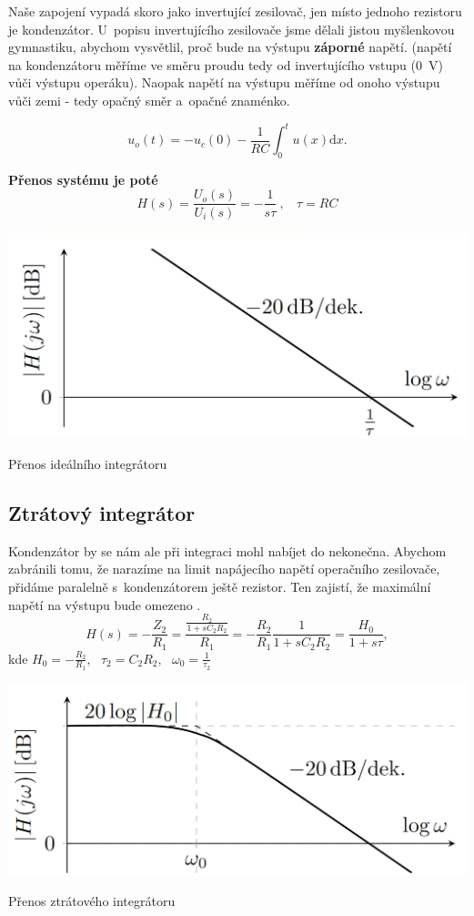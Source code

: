\documentclass[a4paper,12pt]{article}   %
\begin{document}
Naše zapojení vypadá skoro jako invertující zesilovač, jen místo jednoho rezistoru je kondenzátor. U~popisu invertujícího zesilovače jsme dělali jistou myšlenkovou gymnastiku, abychom vysvětlil, proč bude na výstupu \textbf{záporné} napětí. (napětí na kondenzátoru měříme ve směru proudu tedy od invertujícího vstupu (0~V) vůči výstupu operáku). Naopak napětí na výstupu měříme od onoho výstupu vůči zemi - tedy opačný směr a~opačné znaménko.

\begin{equation*}
    u_o(t) = - u_c(0) - \frac{1}{RC}\int_0^t u(x)\text{d}x.
\end{equation*}

\textbf{Přenos systému je poté}
\begin{equation}
    H(s) = \frac{U_o(s)}{U_i(s)} = -\frac{1}{s\tau}~,~~~~\tau = RC
\end{equation}
\begin{graf}
    \centering
    \includegraphics[width=.7\textwidth]{integrator-ideal-prenos.PNG}
    \caption{Přenos ideálního integrátoru}
\end{graf}

\subsection*{Ztrátový integrátor}
Kondenzátor by se nám ale při integraci mohl nabíjet do nekonečna. Abychom zabránili tomu, že narazíme na limit napájecího napětí operačního zesilovače, přidáme paralelně s~kondenzátorem ještě rezistor. Ten zajistí, že maximální napětí na výstupu bude omezeno .
\begin{equation}
    H(s) = -\frac{Z_2}{R_1} = \frac{\frac{R_2}{1+sC_2R_2}}{R_1} = -\frac{R_2}{R_1}\frac{1}{1+sC_2R_2} = \frac{H_0}{1+s\tau},
\end{equation}
kde $H_0 = -\frac{R_2}{R_1},~~~\tau_2 = C_2 R_2,~~~\omega_0 = \frac{1}{\tau_2}$
\begin{graf}
    \centering
    \includegraphics[width=.7\textwidth]{integrator-real-prenos.PNG}
    \caption{Přenos ztrátového integrátoru}
\end{graf}
\end{document}
